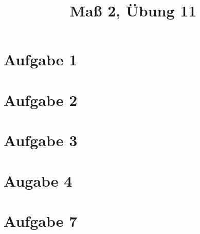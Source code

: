 \documentclass[]{article}
\author{}
\title{Maß 2, Übung 11}
\begin{document}
    \begin{titlepage}
        \maketitle
    \end{titlepage}
    
    \section{Aufgabe 1}
    
    \section{Aufgabe 2}
    
    \section{Aufgabe 3}
    
    \section{Augabe 4}
    
    \section{Aufgabe 7}
    
    
    
    
\end{document}
